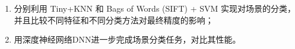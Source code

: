 \begin{enumerate}
	\item 分别利用 Tiny+KNN 和 Bags of Words (SIFT) + SVM 实现对场景的分类，并且比较不同特征和不同分类方法对最终精度的影响；
	\item 用深度神经网络DNN进一步完成场景分类任务，对比其性能。
\end{enumerate}